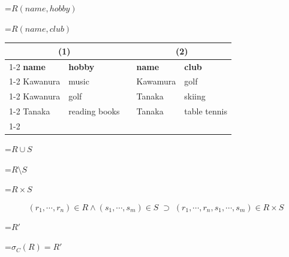 {\newpage
\clearpage
\samepage \setbox\sizebox=\hbox{$R(name,hobby)$}\box\sizebox
}

{\newpage
\clearpage
\samepage \setbox\sizebox=\hbox{$R(name,club)$}\box\sizebox
}

{\newpage
\clearpage
\samepage \begin{table}[ht]
\begin{center}
\label{t:tab4}
\begin{tabular}{|l|l|l|l|l|}
\multicolumn{2}{c}{(1)}&\multicolumn{1}{c}{}
	&\multicolumn{2}{c}{(2)}\\ \cline{1-2}\cline{4-5}
{\bf name}	&{\bf hobby}	&	&{\bf name}	&{\bf club}
\\ \cline{1-2}\cline{4-5}
Kawanura	&music	&	&Kawamura &golf\\ \cline{1-2}\cline{4-5}
Kawanura	&golf	&	&Tanaka	&skiing\\ \cline{1-2}\cline{4-5}
Tanaka		&reading books	& &Tanaka &table tennis\\ \cline{1-2}\cline{4-5}
\end{tabular}
\end{center}
\end{table}
}

{\newpage
\clearpage
\samepage \setbox\sizebox=\hbox{$R\cup S$}\box\sizebox
}

{\newpage
\clearpage
\samepage \setbox\sizebox=\hbox{$R\setminus S$}\box\sizebox
}

{\newpage
\clearpage
\samepage \setbox\sizebox=\hbox{$R\times S$}\box\sizebox
}

{\newpage
\clearpage
\samepage \begin{displaymath}(r_1,\cdots,r_n)\in R\wedge(s_1,\cdots,s_m)\in S\;\supset\;
	(r_1,\cdots,r_n,s_1,\cdots,s_m)\in R\times S\end{displaymath}
}

{\newpage
\clearpage
\samepage \setbox\sizebox=\hbox{$R'$}\box\sizebox
}

{\newpage
\clearpage
\samepage \setbox\sizebox=\hbox{$\sigma_C(R)=R'$}\box\sizebox
}

